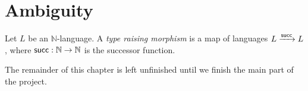 \section{Ambiguity}
\begin{definition}
  Let \( L \) be an \( \mathbb N \)-language.
  A \emph{type raising morphism} is a map of languages \( L \xrightarrow{\operatorname{\mathsf{succ}}} L \), where \( \operatorname{\mathsf{succ}} : \mathbb N \to \mathbb N \) is the successor function.
\end{definition}
The remainder of this chapter is left unfinished until we finish the main part of the project.
